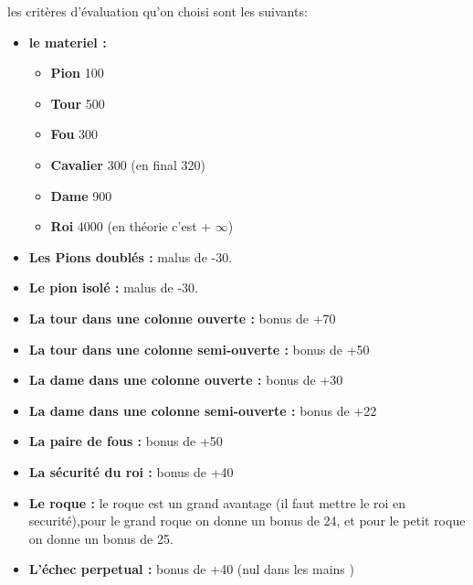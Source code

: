 \documentclass[12pt]{report}
\begin{document}
 les critères d'évaluation qu'on choisi sont les suivants:
 \newpage
 \begin{itemize}
 	\item \textbf{le materiel :} 
 	\newline
 	\begin{itemize}
 		\item \textbf{ Pion }	 100 \\
 \item \textbf{	Tour }    500 \\
 \item \textbf{	Fou   }   300 \\
 \item \textbf{	Cavalier} 300 (en final 320) \\
 \item \textbf{	Dame	 }900 \\
 \item \textbf{	Roi		 }4000 (en théorie c'est + $\infty$) \\
 \end{itemize} 
	\item \textbf{Les Pions doublés :} malus de -30.\\
	\item \textbf{Le pion isolé :}     malus de -30.\\
	\item \textbf{La tour dans une colonne ouverte :} bonus de +70\\
	\item \textbf{La tour dans une colonne semi-ouverte :} bonus de +50\\	
	\item \textbf{La dame dans une colonne ouverte :} bonus de +30\\
	\item \textbf{La dame dans une colonne semi-ouverte :} bonus de +22\\	
	\item \textbf{La paire de fous :} bonus de +50\\	
	\item \textbf{La sécurité du roi :} bonus de +40\\	
	\item \textbf{Le roque :} le roque est un grand avantage (il faut mettre le roi en securité),pour le grand roque on donne un bonus de 24, et pour le petit roque on donne un bonus de 25. \\	
	\item \textbf{L'échec perpetual :} bonus de +40 (nul dans les mains )\\

\end{itemize}
\end{document}
